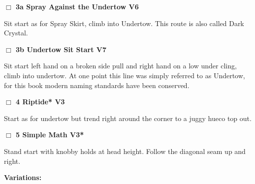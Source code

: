 \begin{multicols}{2}
\begin{adjustwidth}{0.5cm}{}
\needspace{2em}
\label{vr:Spray Against the Undertow}
\colorbox{RoyalBlue!20}{
\parbox{0.95\linewidth}{
\hspace{-1ex}\textbf{$\Box$
3a Spray Against the Undertow V6  
}}}
\begin{adjustwidth}{1.3em}{}			

Sit start as for Spray Skirt, climb into Undertow. This route is also called Dark Crystal.
\end{adjustwidth}




\needspace{2em}
\label{vr:Undertow Sit Start}
\colorbox{Goldenrod!20}{
\parbox{0.95\linewidth}{
\hspace{-1ex}\textbf{$\Box$
3b Undertow Sit Start V7  
}}}
\begin{adjustwidth}{1.3em}{}			

Sit start left hand on a broken side pull and right hand on a low under cling, climb into undertow. At one point this line was simply referred to as Undertow, for this book modern naming standards have been conserved.
\end{adjustwidth}



\end{adjustwidth}


\needspace{2em}
\label{rt:Riptide}
\colorbox{green!20}{
\parbox{0.95\linewidth}{
\hspace{-1ex}\textbf{$\Box$
4 Riptide* V3  
}}}
\begin{adjustwidth}{1.3em}{}			

Start as for undertow but trend right around the corner to a juggy hueco top out.
\end{adjustwidth}




\needspace{2em}
\label{rt:Simple Math}
\colorbox{green!20}{
\parbox{0.95\linewidth}{
\hspace{-1ex}\textbf{$\Box$
5 Simple Math V3*  
}}}
\begin{adjustwidth}{1.3em}{}			

Stand start with knobby holds at head height. Follow the diagonal seam up and right.
\end{adjustwidth}


\begin{adjustwidth}{0.5cm}{}				
\needspace{4em}
\textbf{Variations:} \newline


\end{adjustwidth}
\end{multicols}
